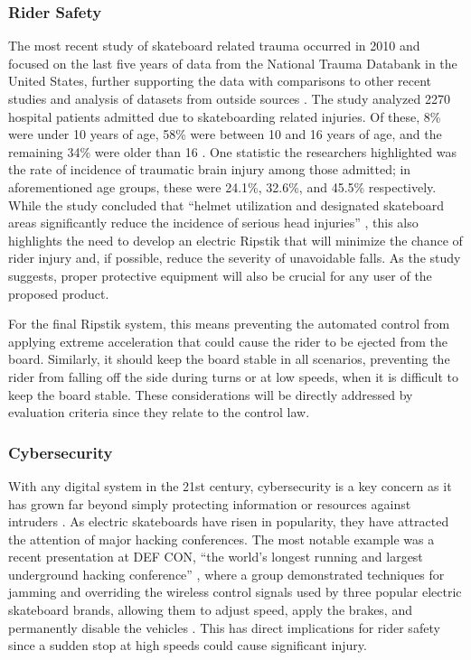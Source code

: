 \subsubsection{Rider Safety}
The most recent study of skateboard related trauma occurred in 2010 and focused on the last five years of data from the National Trauma Databank in the United States, further supporting the data with comparisons to other recent studies and analysis of datasets from outside sources \cite{Injury}. The study analyzed 2270 hospital patients admitted due to skateboarding related injuries. Of these, 8\% were under 10 years of age, 58\% were between 10 and 16 years of age, and the remaining 34\% were older than 16 \cite{Injury}. One statistic the researchers highlighted was the rate of incidence of traumatic brain injury among those admitted; in aforementioned age groups, these were 24.1\%, 32.6\%, and 45.5\% respectively\cite{Injury}. While the study concluded that ``helmet utilization and designated skateboard areas significantly reduce the incidence of serious head injuries'' \cite{Injury}, this also highlights the need to develop an electric Ripstik that will minimize the chance of rider injury and, if possible, reduce the severity of unavoidable falls. As the study suggests, proper protective equipment will also be crucial for any user of the proposed product. 

For the final Ripstik system, this means preventing the automated control from applying extreme acceleration that could cause the rider to be ejected from the board. Similarly, it should keep the board stable in all scenarios, preventing the rider from falling off the side during turns or at low speeds, when it is difficult to keep the board stable. These considerations will be directly addressed by evaluation criteria since they relate to the control law.
\subsubsection{Cybersecurity} \label{Cybersecurity}
With any digital system in the 21st century, cybersecurity is a key concern as it has grown far beyond simply protecting information or resources against intruders \cite{cybersecurity}. As electric skateboards have risen in popularity, they have attracted the attention of major hacking conferences. The most notable example was a recent presentation at DEF CON, ``the world's longest running and largest underground hacking conference'' \cite{DEFCONsite}, where a group demonstrated techniques for jamming and overriding the wireless control signals used by three popular electric skateboard brands, allowing them to adjust speed, apply the brakes, and permanently disable the vehicles \cite{DEFCON,wiredArticle}. This has direct implications for rider safety since a sudden stop at high speeds could cause significant injury. 

